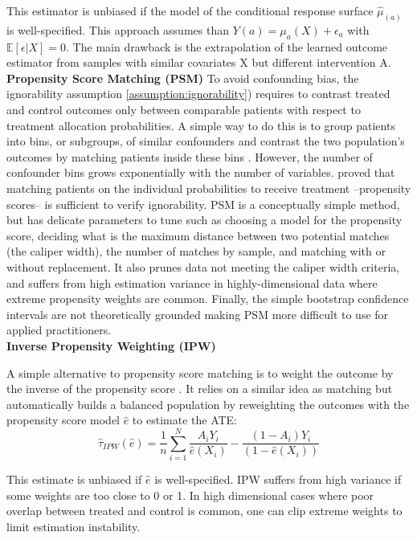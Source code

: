 \documentclass[10pt,letterpaper]{article}
\begin{document}
This estimator is unbiased if the model of the conditional response surface
$\hat \mu_{(a)}$ is well-specified. This approach assumes than $Y(a) =
  \mu_a(X) + \epsilon_a$ with $\mathbb E[\epsilon|X] = 0$. The main drawback is
the extrapolation of the learned outcome estimator from samples with similar
covariates X but different intervention A.\\

\textbf{Propensity Score Matching (PSM)} To avoid confounding bias, the
ignorability assumption \ref{assumption:ignorability}) requires to contrast
treated and control outcomes only between comparable patients with respect to
treatment allocation probabilities. A simple way to do this is to group
patients into bins, or subgroups, of similar confounders and contrast the two
population's outcomes by matching patients inside these bins
\cite{stuart2010matching}. However, the number of confounder bins grows
exponentially with the number of variables. \cite{rosenbaum1983central} proved
that matching patients on the individual probabilities to receive treatment
--propensity scores-- is sufficient to verify ignorability. PSM is a
conceptually simple method, but has delicate parameters to tune such as
choosing a model for the propensity score, deciding what is the maximum
distance between two potential matches (the caliper width), the number of
matches by sample, and matching with or without replacement. It also prunes data
not meeting the caliper width criteria, and suffers from high estimation
variance in highly-dimensional data where extreme propensity weights are common.
Finally, the simple bootstrap confidence intervals are not theoretically
grounded \cite{abadie2008failure} making PSM more difficult
to use for applied practitioners.\\

\textbf{Inverse Propensity Weighting (IPW)}

A simple alternative to propensity score matching is to weight the outcome by
the inverse of the propensity score \cite{austin2015moving}. It relies on a
similar idea as matching but automatically builds a balanced population by
reweighting the outcomes with the propensity score model $\hat{e}$ to estimate
the ATE:
\begin{equation}
  \hat \tau_{IPW}(\hat e) = \frac{1}{n} \sum_{i=1}^N \frac{A_i Y_i}{\hat e(X_i)} - \frac{(1-A_i)Y_i}{(1-\hat e(X_i))}
\end{equation}

This estimate is unbiased if $\hat e$ is well-specified. IPW suffers from high
variance if some weights are too close to 0 or 1. In high dimensional cases
where poor overlap between treated and control is common, one can clip extreme
weights to limit estimation instability.\\
\end{document}
